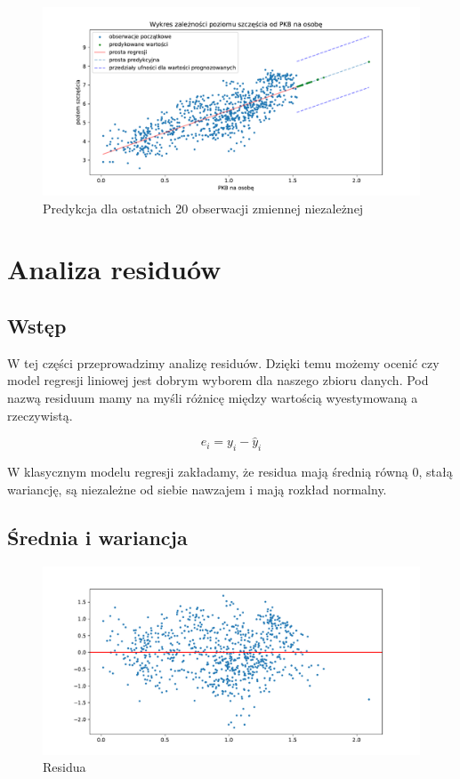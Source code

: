 \documentclass{article}
\theoremstyle{break}
\begin{document}
\begin{figure}[H]
	\begin{center}
		\includegraphics[scale=0.6]{pred.pdf}
		\caption{Predykcja dla ostatnich 20 obserwacji zmiennej niezależnej}
		\label{fig:predykcja}
	\end{center}
\end{figure}

\section{Analiza residuów}
\subsection{Wstęp}

W tej części przeprowadzimy analizę residuów. Dzięki temu możemy ocenić czy model regresji liniowej jest dobrym wyborem dla naszego zbioru danych. Pod nazwą residuum mamy na myśli różnicę między wartością wyestymowaną a rzeczywistą.

\begin{equation}
	e_i = y_i - \hat{y}_i
\end{equation}

W klasycznym modelu regresji zakładamy, że residua mają średnią równą 0, stałą wariancję, są niezależne od siebie nawzajem i mają rozkład normalny.

\subsection{Średnia i wariancja}
\begin{figure}[H]
	\begin{center}
		\includegraphics[scale=0.5]{res.pdf}
		\caption{Residua}
		\label{fig:res}
	\end{center}
\end{figure}
\end{document}
